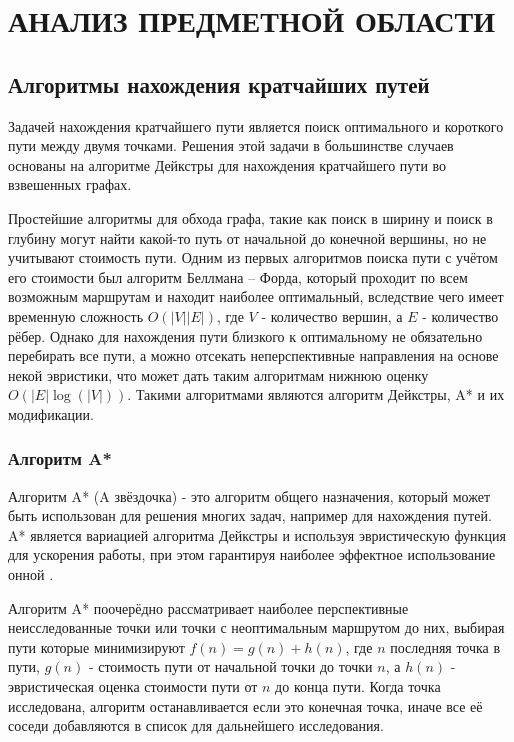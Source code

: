 \section[Анализ предметной области]{\MakeTextUppercase{АНАЛИЗ ПРЕДМЕТНОЙ ОБЛАСТИ}}
\vspace{-1\baselineskip} 
\subsection{Алгоритмы нахождения кратчайших путей}

Задачей нахождения кратчайшего пути является поиск оптимального и короткого пути между двумя точками. Решения этой задачи в большинстве случаев основаны на алгоритме Дейкстры \cite{Dijkstra} для нахождения кратчайшего пути во взвешенных графах. 

Простейшие алгоритмы для обхода графа, такие как поиск в ширину и поиск в глубину могут найти какой-то путь от начальной до конечной вершины, но не учитывают стоимость пути. Одним из первых алгоритмов поиска пути с учётом его стоимости был алгоритм Беллмана -- Форда, который проходит по всем возможным маршрутам и находит наиболее оптимальный, вследствие чего имеет временную сложность $O(|V||E|)$, где $V$ - количество вершин, а $E$ - количество рёбер. Однако для нахождения пути близкого к оптимальному не обязательно перебирать все пути, а можно отсекать неперспективные направления на основе некой эвристики, что может дать таким алгоритмам нижнюю оценку $O(|E|\log(|V|))$. Такими алгоритмами являются алгоритм Дейкстры, A* и их модификации.

\subsubsection{Алгоритм A*}

Алгоритм A{*} (A звёздочка) - это алгоритм общего назначения, который может быть использован для решения многих задач, например для нахождения путей. A{*} является вариацией алгоритма Дейкстры и используя эвристическую функция для ускорения работы, при этом гарантируя наиболее эффектное использование онной \cite{A_STAR}. 

Алгоритм A{*} поочерёдно рассматривает наиболее перспективные неисследованные точки или точки с неоптимальным маршрутом до них, выбирая пути которые минимизируют $ f(n) = g(n) + h(n) $, где $n$ последняя точка в пути, $g(n)$ - стоимость пути от начальной точки до точки $n$, а $h(n)$ - эвристическая оценка стоимости пути от $n$ до конца пути. Когда точка исследована, алгоритм останавливается если это конечная точка, иначе все её соседи добавляются в список для дальнейшего исследования.


